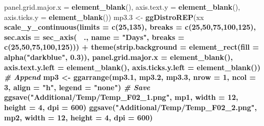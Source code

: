 \documentclass[
]{article}
\newenvironment{Shaded}{\begin{snugshade}}{\end{snugshade}}
\newcommand{\CommentTok}[1]{\textcolor[rgb]{0.56,0.35,0.01}{\textit{#1}}}
\newcommand{\DataTypeTok}[1]{\textcolor[rgb]{0.13,0.29,0.53}{#1}}
\newcommand{\DecValTok}[1]{\textcolor[rgb]{0.00,0.00,0.81}{#1}}
\newcommand{\FloatTok}[1]{\textcolor[rgb]{0.00,0.00,0.81}{#1}}
\newcommand{\KeywordTok}[1]{\textcolor[rgb]{0.13,0.29,0.53}{\textbf{#1}}}
\newcommand{\NormalTok}[1]{#1}
\newcommand{\OperatorTok}[1]{\textcolor[rgb]{0.81,0.36,0.00}{\textbf{#1}}}
\newcommand{\StringTok}[1]{\textcolor[rgb]{0.31,0.60,0.02}{#1}}
\begin{document}
\begin{Shaded}
\begin{Highlighting}[]
{{{{{{{{{{{{{{{{        \DataTypeTok{panel.grid.major.x =} \KeywordTok{element_blank}\NormalTok{(),}
        \DataTypeTok{axis.text.y =} \KeywordTok{element_blank}\NormalTok{(), }
        \DataTypeTok{axis.ticks.y =} \KeywordTok{element_blank}\NormalTok{())}
\NormalTok{mp3}\FloatTok{.3}\NormalTok{ <-}\StringTok{ }\KeywordTok{ggDistroREP}\NormalTok{(xx }\OperatorTok{%
\StringTok{  }\KeywordTok{scale_y_continuous}\NormalTok{(}\DataTypeTok{limits =} \KeywordTok{c}\NormalTok{(}\DecValTok{25}\NormalTok{,}\DecValTok{135}\NormalTok{), }\DataTypeTok{breaks =} \KeywordTok{c}\NormalTok{(}\DecValTok{25}\NormalTok{,}\DecValTok{50}\NormalTok{,}\DecValTok{75}\NormalTok{,}\DecValTok{100}\NormalTok{,}\DecValTok{125}\NormalTok{),}
                     \DataTypeTok{sec.axis =} \KeywordTok{sec_axis}\NormalTok{(}\OperatorTok{~}\StringTok{ }\NormalTok{., }\DataTypeTok{name =} \StringTok{"Days"}\NormalTok{,}
                       \DataTypeTok{breaks =} \KeywordTok{c}\NormalTok{(}\DecValTok{25}\NormalTok{,}\DecValTok{50}\NormalTok{,}\DecValTok{75}\NormalTok{,}\DecValTok{100}\NormalTok{,}\DecValTok{125}\NormalTok{))) }\OperatorTok{+}
\StringTok{  }\KeywordTok{theme}\NormalTok{(}\DataTypeTok{strip.background =} \KeywordTok{element_rect}\NormalTok{(}\DataTypeTok{fill =} \KeywordTok{alpha}\NormalTok{(}\StringTok{"darkblue"}\NormalTok{, }\FloatTok{0.3}\NormalTok{)),}
        \DataTypeTok{panel.grid.major.x =} \KeywordTok{element_blank}\NormalTok{(),}
        \DataTypeTok{axis.text.y.left =} \KeywordTok{element_blank}\NormalTok{(),}
        \DataTypeTok{axis.ticks.y.left =} \KeywordTok{element_blank}\NormalTok{())}
\CommentTok{# Append}
\NormalTok{mp3 <-}\StringTok{ }\KeywordTok{ggarrange}\NormalTok{(mp3}\FloatTok{.1}\NormalTok{, mp3}\FloatTok{.2}\NormalTok{, mp3}\FloatTok{.3}\NormalTok{, }\DataTypeTok{nrow =} \DecValTok{1}\NormalTok{, }\DataTypeTok{ncol =} \DecValTok{3}\NormalTok{, }\DataTypeTok{align =} \StringTok{"h"}\NormalTok{, }\DataTypeTok{legend =} \StringTok{"none"}\NormalTok{)}
\CommentTok{# Save}
\KeywordTok{ggsave}\NormalTok{(}\StringTok{"Additional/Temp/Temp_F02_1.png"}\NormalTok{, mp1, }\DataTypeTok{width =} \DecValTok{12}\NormalTok{, }\DataTypeTok{height =} \DecValTok{4}\NormalTok{, }\DataTypeTok{dpi =} \DecValTok{600}\NormalTok{)}
\KeywordTok{ggsave}\NormalTok{(}\StringTok{"Additional/Temp/Temp_F02_2.png"}\NormalTok{, mp2, }\DataTypeTok{width =} \DecValTok{12}\NormalTok{, }\DataTypeTok{height =} \DecValTok{4}\NormalTok{, }\DataTypeTok{dpi =} \DecValTok{600}\NormalTok{)}
}}}}}}}}}}}}}}}}}
\end{Highlighting}
\end{Shaded}
\end{document}
